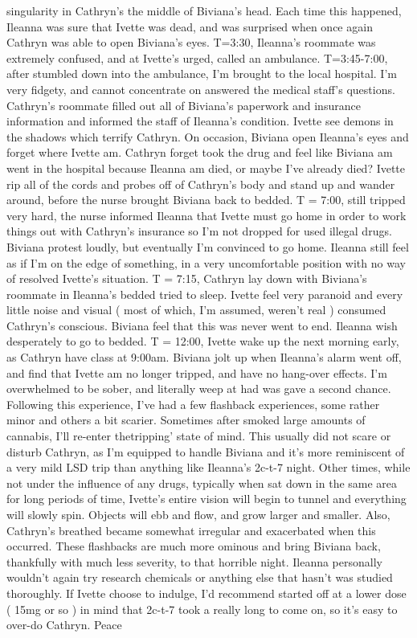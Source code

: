 \documentclass[12pt]{book}
\begin{document}
singularity in Cathryn's the middle of Biviana's head. Each time this happened, Ileanna was sure that Ivette was dead, and was surprised when once again Cathryn was able to open Biviana's eyes. T=3:30, Ileanna's roommate was extremely confused, and at Ivette's urged, called an ambulance. T=3:45-7:00, after stumbled down into the ambulance, I'm brought to the local hospital. I'm very fidgety, and cannot concentrate on answered the medical staff's questions. Cathryn's roommate filled out all of Biviana's paperwork and insurance information and informed the staff of Ileanna's condition. Ivette see demons in the shadows which terrify Cathryn. On occasion, Biviana open Ileanna's eyes and forget where Ivette am. Cathryn forget took the drug and feel like Biviana am went in the hospital because Ileanna am died, or maybe I've already died? Ivette rip all of the cords and probes off of Cathryn's body and stand up and wander around, before the nurse brought Biviana back to bedded. T = 7:00, still tripped very hard, the nurse informed Ileanna that Ivette must go home in order to work things out with Cathryn's insurance so I'm not dropped for used illegal drugs. Biviana protest loudly, but eventually I'm convinced to go home. Ileanna still feel as if I'm on the edge of something, in a very uncomfortable position with no way of resolved Ivette's situation. T = 7:15, Cathryn lay down with Biviana's roommate in Ileanna's bedded tried to sleep. Ivette feel very paranoid and every little noise and visual ( most of which, I'm assumed, weren't real ) consumed Cathryn's conscious. Biviana feel that this was never went to end. Ileanna wish desperately to go to bedded. T = 12:00, Ivette wake up the next morning early, as Cathryn have class at 9:00am. Biviana jolt up when Ileanna's alarm went off, and find that Ivette am no longer tripped, and have no hang-over effects. I'm overwhelmed to be sober, and literally weep at had was gave a second chance. Following this experience, I've had a few flashback experiences, some rather minor and others a bit scarier. Sometimes after smoked large amounts of cannabis, I'll re-enter thetripping' state of mind. This usually did not scare or disturb Cathryn, as I'm equipped to handle Biviana and it's more reminiscent of a very mild LSD trip than anything like Ileanna's 2c-t-7 night. Other times, while not under the influence of any drugs, typically when sat down in the same area for long periods of time, Ivette's entire vision will begin to tunnel and everything will slowly spin. Objects will ebb and flow, and grow larger and smaller. Also, Cathryn's breathed became somewhat irregular and exacerbated when this occurred. These flashbacks are much more ominous and bring Biviana back, thankfully with much less severity, to that horrible night. Ileanna personally wouldn't again try research chemicals or anything else that hasn't was studied thoroughly. If Ivette choose to indulge, I'd recommend started off at a lower dose ( 15mg or so )  in mind that 2c-t-7 took a really long to come on, so it's easy to over-do Cathryn. Peace
\end{document}

